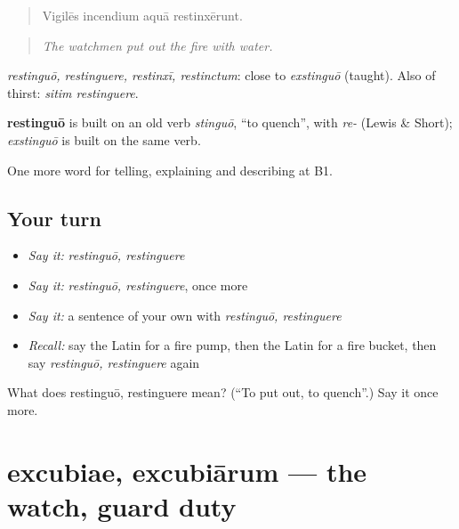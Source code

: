 \begin{quote}
Vigilēs incendium aquā restinxērunt.
\end{quote}

\begin{quote}
\emph{The watchmen put out the fire with water.}
\end{quote}

\emph{restinguō, restinguere, restinxī, restinctum}: close to \emph{exstinguō} (taught). Also of thirst: \emph{sitim restinguere}.

\begin{cousinweb}
\textbf{restinguō} is built on an old verb \emph{stinguō}, \textquotedblleft{}to quench\textquotedblright{}, with \emph{re-} (Lewis \& Short); \emph{exstinguō} is built on the same verb.
\end{cousinweb}

\begin{grammarlens}[title={What you've built}]
One more word for telling, explaining and describing at B1.
\end{grammarlens}

\subsection*{Your turn}
\begin{itemize}
\raggedright
  \item \emph{Say it:} \emph{restinguō, restinguere}
  \item \emph{Say it:} \emph{restinguō, restinguere}, once more
  \item \emph{Say it:} a sentence of your own with \emph{restinguō, restinguere}
  \item \emph{Recall:} say the Latin for a fire pump, then the Latin for a fire bucket, then say \emph{restinguō, restinguere} again
\end{itemize}

\begin{tcolorbox}[breakable,colback=teal!4,colframe=teal!35!black,title={Before you move on}]
What does restinguō, restinguere mean? (\textquotedblleft{}To put out, to quench\textquotedblright{}.) Say it once more.
\end{tcolorbox}
\section[excubiae, excubiārum]{excubiae, excubiārum — the watch, guard duty}

\label{lesson:LA-C319-excubiae}



